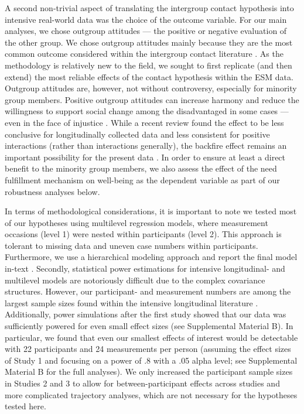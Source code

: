 \documentclass[man, 12pt, a4paper, mask]{apa7}
\theoremstyle{break}
\theoremstyle{plain}
\begin{document}
A second non-trivial aspect of translating the intergroup contact hypothesis into intensive real-world data was the choice of the outcome variable. For our main analyses, we chose outgroup attitudes --- the positive or negative evaluation of the other group. We chose outgroup attitudes mainly because they are the most common outcome considered within the intergroup contact literature \citep[e.g.,][]{Pettigrew2006, Paolini2021}. As the methodology is relatively new to the field, we sought to first replicate (and then extend) the most reliable effects of the contact hypothesis within the ESM data. Outgroup attitudes are, however, not without controversy, especially for minority group members. Positive outgroup attitudes can increase harmony and reduce the willingness to support social change among the disadvantaged in some cases --- even in the face of injustice \citep[e.g.,][]{dixon2012, saguy2009}. While a recent review found the effect to be less conclusive for longitudinally collected data and less consistent for positive interactions (rather than interactions generally), the backfire effect remains an important possibility for the present data \citep[see][]{reimer2023}. In order to ensure at least a direct benefit to the minority group members, we also assess the effect of the need fulfillment mechanism on well-being as the dependent variable as part of our robustness analyses below.

In terms of methodological considerations, it is important to note we tested most of our hypotheses using multilevel regression models, where measurement occasions (level 1) were nested within participants (level 2). This approach is tolerant to missing data and uneven case numbers within participants. Furthermore, we use a hierarchical modeling approach and report the final model in-text \citep[][; for the full modeling process see Supplementary Material A]{snijders2012}. Secondly, statistical power estimations for intensive longitudinal- and multilevel models are notoriously difficult due to the complex covariance structures. However, our participant- and measurement numbers are among the largest sample sizes found within the intensive longitudinal literature \citep[e.g.,][]{AanhetRot2012}. Additionally, power simulations after the first study showed that our data was sufficiently powered for even small effect sizes (see Supplemental Material B). In particular, we found that even our smallest effects of interest would be detectable with 22 participants and 24 measurements per person (assuming the effect sizes of Study 1 and focusing on a power of .8 with a .05 alpha level; see Supplemental Material B for the full analyses). We only increased the participant sample sizes in Studies 2 and 3 to allow for between-participant effects across studies and more complicated trajectory analyses, which are not necessary for the hypotheses tested here.
\end{document}

